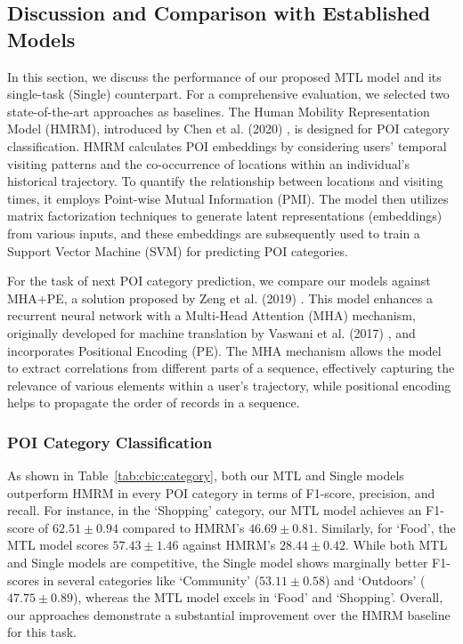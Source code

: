 \subsection{Discussion and Comparison with Established Models}
In this section, we discuss the performance of our proposed MTL model and its single-task (Single) counterpart. For a comprehensive evaluation, we selected two state-of-the-art approaches as baselines. The Human Mobility Representation Model (HMRM), introduced by Chen et al. (2020) \cite{chen2020modeling}, is designed for POI category classification. HMRM calculates POI embeddings by considering users' temporal visiting patterns and the co-occurrence of locations within an individual's historical trajectory. To quantify the relationship between locations and visiting times, it employs Point-wise Mutual Information (PMI). The model then utilizes matrix factorization techniques to generate latent representations (embeddings) from various inputs, and these embeddings are subsequently used to train a Support Vector Machine (SVM) for predicting POI categories.

For the task of next POI category prediction, we compare our models against MHA+PE, a solution proposed by Zeng et al. (2019) \cite{zeng2019next}. This model enhances a recurrent neural network with a Multi-Head Attention (MHA) mechanism, originally developed for machine translation by Vaswani et al. (2017) \cite{vaswani2017attention}, and incorporates Positional Encoding (PE). The MHA mechanism allows the model to extract correlations from different parts of a sequence, effectively capturing the relevance of various elements within a user's trajectory, while positional encoding helps to propagate the order of records in a sequence.

\subsubsection{POI Category Classification}
As shown in Table~\ref{tab:cbic:category}, both our MTL and Single models outperform HMRM \cite{chen2020modeling} in every POI category in terms of F1-score, precision, and recall. For instance, in the `Shopping' category, our MTL model achieves an F1-score of $62.51 \pm 0.94$ compared to HMRM's $46.69 \pm 0.81$. Similarly, for `Food', the MTL model scores $57.43 \pm 1.46$ against HMRM's $28.44 \pm 0.42$. While both MTL and Single models are competitive, the Single model shows marginally better F1-scores in several categories like `Community' ($53.11 \pm 0.58$) and `Outdoors' ($47.75 \pm 0.89$), whereas the MTL model excels in `Food' and `Shopping'. Overall, our approaches demonstrate a substantial improvement over the HMRM baseline for this task.

